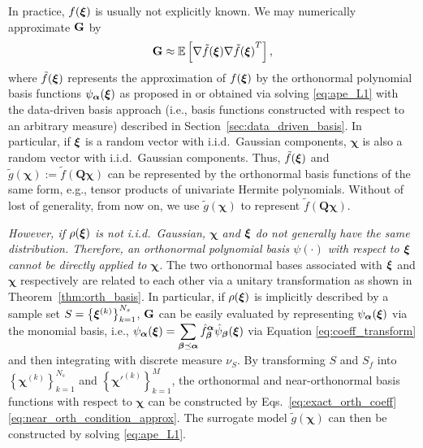 In practice, $f(\bm\xi)$ is usually not explicitly known.
We may numerically approximate $\mathbf G$ by 
\begin{equation}
  \mathbf{G} \approx \mathbb{E} \left[ \nabla \tilde{f} (\bm\xi) {\nabla \tilde{f} (\bm\xi)}^T\right],
  \label{eq:G_approx}  
\end{equation}
where $\tilde{f}(\bm\xi)$ represents the approximation of $f(\bm\xi)$ by the orthonormal polynomial basis functions $\psi_{\bm\alpha}(\bm\xi)$ as proposed in \cite{Lei_Yang_MMS_2015} or obtained via solving \eqref{eq:ape_L1} with the data-driven basis approach (i.e., basis functions constructed with respect to an arbitrary measure) described in Section~\ref{sec:data_driven_basis}.
In particular, if $\bm\xi$ {\color{blue}is a random vector with i.i.d.\ Gaussian components, $\bm\chi$ is also 
a random vector with i.i.d.\ Gaussian components.
Thus, $\tilde{f}(\bm\xi)$ and $\tilde{g}(\bm\chi):=\tilde{f}(\mathbf{Q} \bm\chi)$ can be 
represented by the orthonormal basis functions of the same form, e.g., tensor products of univariate 
Hermite polynomials. Without of lost of generality, from now on, we use $\tilde{g}(\bm\chi)$ to 
represent $\tilde{f}(\mathbf{Q} \bm\chi)$.} 

\emph{However, if $\rho(\bm\xi)$  is not i.i.d.\ Gaussian, $\bm\chi$ and $\bm\xi$ do not generally have the same distribution.
Therefore, an orthonormal polynomial basis $\psi(\cdot)$ with respect to $\bm\xi$ \emph{cannot} be directly applied to $\bm\chi$.}
The two orthonormal bases associated with $\bm\xi$ and $\bm\chi$ respectively are related to each other via a unitary 
transformation as shown in Theorem~\ref{thm:orth_basis}.
In particular, if $\rho(\bm\xi)$ is implicitly described by a sample set $S = \left\{\bm\xi^{(k)}\right\}_{k = 1}^{N_s}$, $\mathbf G$ can be easily evaluated by representing $\psi_{\bm\alpha}(\bm\xi)$ via the monomial basis, i.e., $\displaystyle \psi_{\bm\alpha}(\bm\xi) = \sum_{\bm\beta \preceq \bm\alpha} \hat{f}_{\bm\beta}^{\bm\alpha} \hat{\psi}_{\bm\beta}(\bm\xi)$ via Equation \eqref{eq:coeff_transform} and then integrating with discrete measure $\nu_S$. 
By transforming $S$ and $S_f$ into $\left\{{\bm\chi}^{(k)}\right\}_{k = 1}^{N_s}$ and $\left\{{\bm\chi'}^{(k)}\right\}_{k = 1}^{M}$, the orthonormal and near-orthonormal  basis functions with respect to $\bm\chi$ can be constructed by Eqs.~\eqref{eq:exact_orth_coeff} \eqref{eq:near_orth_condition_approx}.
The surrogate model $\tilde{g}(\bm\chi)$ can then be constructed by solving \eqref{eq:ape_L1}.

